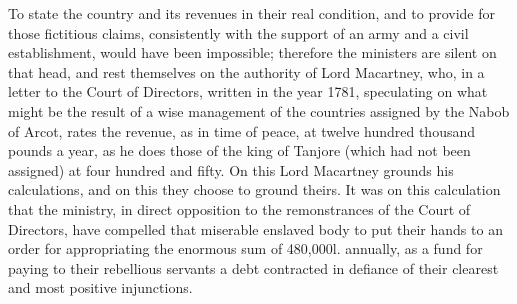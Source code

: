 To state the country and its revenues in their real condition, and to provide for those fictitious claims, consistently with the support of an army and a civil establishment, would have been impossible; therefore the ministers are silent on that head, and rest themselves on the authority of Lord Macartney, who, in a letter to the Court of Directors, written in the year 1781, speculating on what might be the result of a wise management of the countries assigned by the Nabob of Arcot, rates the revenue, as in time of peace, at twelve hundred thousand pounds a year, as he does those of the king of Tanjore (which had not been assigned) at four hundred and fifty. On this Lord Macartney grounds his calculations, and on this they choose to ground theirs. It was on this calculation that the ministry, in direct opposition to the remonstrances of the Court of Directors, have compelled that miserable enslaved body to put their hands to an order for appropriating the enormous sum of 480,000l. annually, as a fund for paying to their rebellious servants a debt contracted in defiance of their clearest and most positive injunctions.

